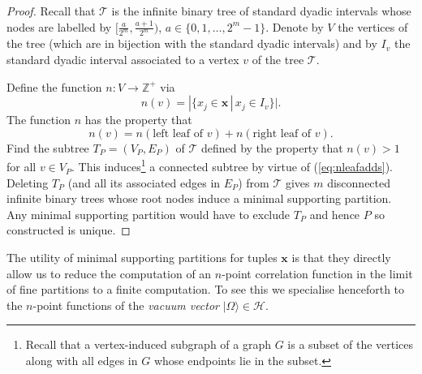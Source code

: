 \documentclass[11pt,oneside]{amsart}
\theoremstyle{plain}%
\theoremstyle{definition}
\theoremstyle{remark}
\begin{document}
\begin{proof}
	Recall that $\mathcal{T}$ is the infinite binary tree of standard dyadic intervals whose nodes are labelled by $[\tfrac{a}{2^m}, \tfrac{a+1}{2^m})$, $a\in\{0,1,\ldots, 2^m-1\}$. Denote by $V$ the vertices of the tree (which are in bijection with the standard dyadic intervals) and by $I_v$ the standard dyadic interval associated to a vertex $v$ of the tree $\mathcal{T}$.

	Define the function $n:V\rightarrow \mathbb{Z}^+$ via
	\begin{equation}
		n(v) = |\{x_j\in\mathbf{x}\,|\, x_j\in I_v\}|.
	\end{equation}
	The function $n$ has the property that
	\begin{equation}\label{eq:nleafadds}
		n(v) = n(\text{left leaf of $v$}) + n(\text{right leaf of $v$}).
	\end{equation}
	Find the subtree $T_P = (V_P, E_P)$ of $\mathcal{T}$ defined by the property that $n(v)>1$ for all $v\in V_P$. This induces\footnote{Recall that a vertex-induced subgraph of a graph $G$ is a subset of the vertices along with all edges in $G$ whose endpoints lie in the subset.} a connected subtree by virtue of (\ref{eq:nleafadds}). Deleting $T_P$ (and all its associated edges in $E_P$) from $\mathcal{T}$ gives $m$ disconnected infinite binary trees whose root nodes induce a minimal supporting partition. Any minimal supporting partition would have to exclude $T_P$ and hence $P$ so constructed is unique.
\end{proof}
The utility of minimal supporting partitions for tuples $\mathbf{x}$ is that they directly allow us to reduce the computation of an $n$-point correlation function in the limit of fine partitions to a finite computation. To see this we specialise henceforth to the $n$-point functions of the \emph{vacuum vector} $|\Omega\rangle\in\mathcal{H}$.
\end{document}
